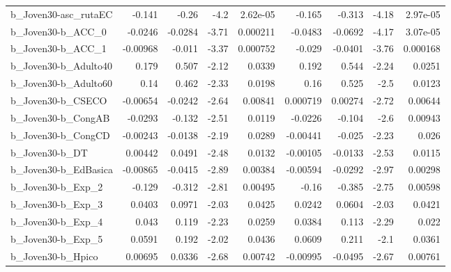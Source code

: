 \begin{tabular}{lrrrrrrrr}
b\_Joven30-asc\_rutaEC       &      -0.141 &        -0.26 &     -4.2 & 2.62e-05 &     -0.165 &      -0.313 &        -4.18 &      2.97e-05 \\
b\_Joven30-b\_ACC\_0          &     -0.0246 &      -0.0284 &    -3.71 & 0.000211 &    -0.0483 &     -0.0692 &        -4.17 &      3.07e-05 \\
b\_Joven30-b\_ACC\_1          &    -0.00968 &       -0.011 &    -3.37 & 0.000752 &     -0.029 &     -0.0401 &        -3.76 &      0.000168 \\
b\_Joven30-b\_Adulto40       &       0.179 &        0.507 &    -2.12 &   0.0339 &      0.192 &       0.544 &        -2.24 &        0.0251 \\
b\_Joven30-b\_Adulto60       &        0.14 &        0.462 &    -2.33 &   0.0198 &       0.16 &       0.525 &         -2.5 &        0.0123 \\
b\_Joven30-b\_CSECO          &    -0.00654 &      -0.0242 &    -2.64 &  0.00841 &   0.000719 &     0.00274 &        -2.72 &       0.00644 \\
b\_Joven30-b\_CongAB         &     -0.0293 &       -0.132 &    -2.51 &   0.0119 &    -0.0226 &      -0.104 &         -2.6 &       0.00943 \\
b\_Joven30-b\_CongCD         &    -0.00243 &      -0.0138 &    -2.19 &   0.0289 &   -0.00441 &      -0.025 &        -2.23 &         0.026 \\
b\_Joven30-b\_DT             &     0.00442 &       0.0491 &    -2.48 &   0.0132 &   -0.00105 &     -0.0133 &        -2.53 &        0.0115 \\
b\_Joven30-b\_EdBasica       &    -0.00865 &      -0.0415 &    -2.89 &  0.00384 &   -0.00594 &     -0.0292 &        -2.97 &       0.00298 \\
b\_Joven30-b\_Exp\_2          &      -0.129 &       -0.312 &    -2.81 &  0.00495 &      -0.16 &      -0.385 &        -2.75 &       0.00598 \\
b\_Joven30-b\_Exp\_3          &      0.0403 &       0.0971 &    -2.03 &   0.0425 &     0.0242 &      0.0604 &        -2.03 &        0.0421 \\
b\_Joven30-b\_Exp\_4          &       0.043 &        0.119 &    -2.23 &   0.0259 &     0.0384 &       0.113 &        -2.29 &         0.022 \\
b\_Joven30-b\_Exp\_5          &      0.0591 &        0.192 &    -2.02 &   0.0436 &     0.0609 &       0.211 &         -2.1 &        0.0361 \\
b\_Joven30-b\_Hpico          &     0.00695 &       0.0336 &    -2.68 &  0.00742 &   -0.00995 &     -0.0495 &        -2.67 &       0.00761 \\

\end{tabular}
